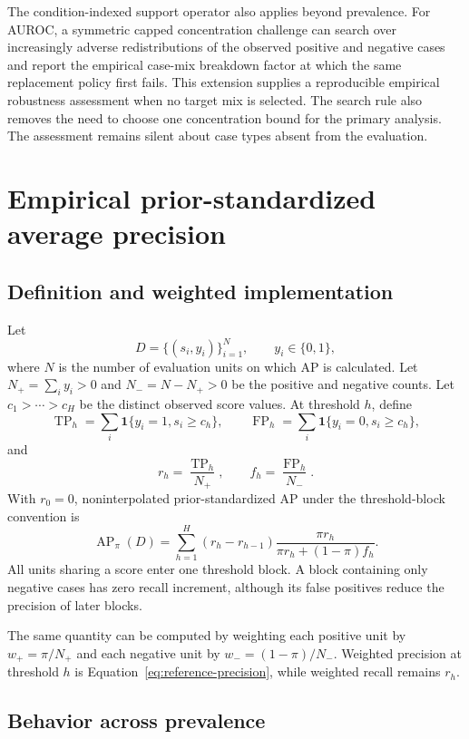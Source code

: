 \documentclass[11pt]{article}
\newcommand{\AP}{\operatorname{AP}}
\theoremstyle{remark}
\begin{document}
The condition-indexed support operator also applies beyond prevalence. For AUROC, a symmetric capped concentration challenge can search over increasingly adverse redistributions of the observed positive and negative cases and report the empirical case-mix breakdown factor at which the same replacement policy first fails. This extension supplies a reproducible empirical robustness assessment when no target mix is selected. The search rule also removes the need to choose one concentration bound for the primary analysis. The assessment remains silent about case types absent from the evaluation.

\appendix

\section{Empirical prior-standardized average precision}
\label{app:ap}

\subsection{Definition and weighted implementation}

Let
\[
D=\{(s_i,y_i)\}_{i=1}^{N},
\qquad
y_i\in\{0,1\},
\]
where $N$ is the number of evaluation units on which AP is calculated. Let $N_+=\sum_i y_i>0$ and $N_-=N-N_+>0$ be the positive and negative counts. Let $c_1>\cdots>c_H$ be the distinct observed score values. At threshold $h$, define
\[
\operatorname{TP}_h
=
\sum_i\mathbf 1\{y_i=1,s_i\geq c_h\},
\qquad
\operatorname{FP}_h
=
\sum_i\mathbf 1\{y_i=0,s_i\geq c_h\},
\]
and
\[
r_h=\frac{\operatorname{TP}_h}{N_+},
\qquad
f_h=\frac{\operatorname{FP}_h}{N_-}.
\]
With $r_0=0$, noninterpolated prior-standardized AP under the threshold-block convention is
\begin{equation}
\AP_\pi(D)
=
\sum_{h=1}^{H}
(r_h-r_{h-1})
\frac{\pi r_h}
{\pi r_h+(1-\pi)f_h}.
\label{eq:empirical-ap}
\end{equation}
All units sharing a score enter one threshold block. A block containing only negative cases has zero recall increment, although its false positives reduce the precision of later blocks.

The same quantity can be computed by weighting each positive unit by $w_+=\pi/N_+$ and each negative unit by $w_-=(1-\pi)/N_-$. Weighted precision at threshold $h$ is Equation~\eqref{eq:reference-precision}, while weighted recall remains $r_h$.

\subsection{Behavior across prevalence}
\end{document}
